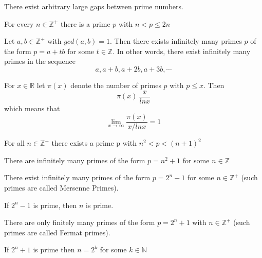 
\begin{note}
There exist arbitrary large gaps between prime numbers. 
\end{note}

\begin{thm}
For every $n\in\mathbb{Z}^+$ there is a prime $p$ with $n< p \leq 2n$
\end{thm}

\begin{thm}
Let $a,b\in\mathbb{Z}^+$ with $gcd(a,b) = 1$. Then there exists infinitely many primes $p$ of the form $p=a+tb$ for some $t\in\mathbb{Z}$. In other words, there exist infinitely many primes in the sequence \[a,a+b,a+2b,a+3b,\cdots\]
\end{thm}

\begin{thm}
    For $x\in\mathbb{R}$ let $\pi (x)$ denote the number of primes $p$ with $p\leq x$. Then \[\pi (x) ~ \frac{x}{lnx}\] which means that \[\lim_{x\to\infty}\frac{\pi (x)}{x/lnx} = 1\]
\end{thm}

\begin{conj}[$n^2$ Conjecture]
For all $n\in\mathbb{Z}^+$ there exists a prime p with $n^2<p < (n+1)^2$
\end{conj}

\begin{conj}[$n^2+1$ Conjecture]
There are infinitely many primes of the form $p=n^2+1$ for some $n\in\mathbb{Z}$
\end{conj}

\begin{conj}
    There exist infinitely many primes of the form $p = 2^n-1$ for some $n\in\mathbb{Z}^+$ (such primes are called Mersenne Primes).
\end{conj}

\begin{exer}
If $2^n-1$ is prime, then $n$ is prime.
\end{exer}

\begin{conj}
    There are only finitely many primes of the form $p=2^n+1$ with $n\in\mathbb{Z}^+$ (such primes are called Fermat primes).
\end{conj}

\begin{exer}
If $2^n+1$ is prime then $n=2^k$ for some $k\in\mathbb{N}$
\end{exer}

